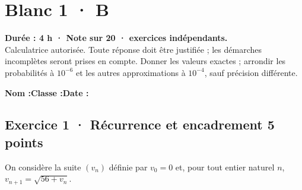 \fi

\fi

\ifmxteacher

\mxnewpage{}\label{sujet:5-4}

\section*{Blanc 1 · B}


\textbf{Durée : 4 h · Note sur 20 ·  exercices indépendants.}\\Calculatrice autorisée. Toute réponse doit être justifiée ; les démarches incomplètes seront prises en compte. Donner les valeurs exactes ; arrondir les probabilités à $10^{-6}$ et les autres approximations à $10^{-4}$, sauf précision différente.

\smallskip\textbf{Nom :}\enspace\dotfill\quad\textbf{Classe :}\enspace\dotfill\quad\textbf{Date :}\enspace\dotfill

\subsection*{Exercice 1 · Récurrence et encadrement \hfill 5 points}On considère la suite $(v_n)$ définie par $v_0=0$ et, pour tout entier naturel $n$, $v_{n+1}=\sqrt{56+v_n}$.

